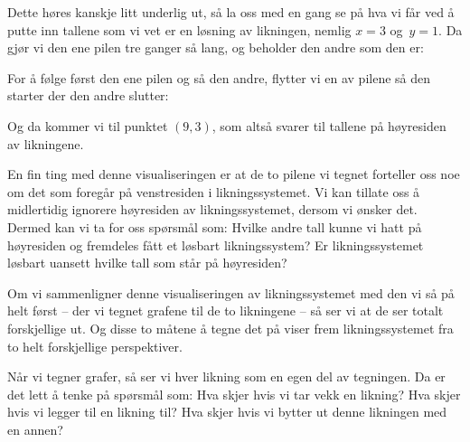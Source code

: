 Dette høres kanskje litt underlig ut, så la oss med en gang se på hva
vi får ved å putte inn tallene som vi vet er en løsning av likningen,
nemlig $x=3$ og~$y=1$.  Da gjør vi den ene pilen tre ganger så lang,
og beholder den andre som den er:
\begin{center}
\end{center}
For å følge først den ene pilen og så den andre, flytter vi en av
pilene så den starter der den andre slutter:
\begin{center}
\end{center}
Og da kommer vi til punktet $(9,3)$, som altså svarer til tallene på
høyresiden av likningene.

En fin ting med denne visualiseringen er at de to pilene vi tegnet
forteller oss noe om det som foregår på venstresiden i
likningssystemet.  Vi kan tillate oss å midlertidig ignorere
høyresiden av likningssystemet, dersom vi ønsker det.  Dermed kan vi
ta for oss spørsmål som: Hvilke andre tall kunne vi hatt på høyresiden
og fremdeles fått et løsbart likningssystem?  Er likningssystemet
løsbart uansett hvilke tall som står på høyresiden?

Om vi sammenligner denne visualiseringen av likningssystemet med den
vi så på helt først -- der vi tegnet grafene til de to likningene --
så ser vi at de ser totalt forskjellige ut.  Og disse to måtene å
tegne det på viser frem likningssystemet fra to helt forskjellige
perspektiver.

Når vi tegner grafer, så ser vi hver likning som en egen del av
tegningen.  Da er det lett å tenke på spørsmål som: Hva skjer hvis vi
tar vekk en likning?  Hva skjer hvis vi legger til en likning til?
Hva skjer hvis vi bytter ut denne likningen med en annen?




\kapittelslutt
